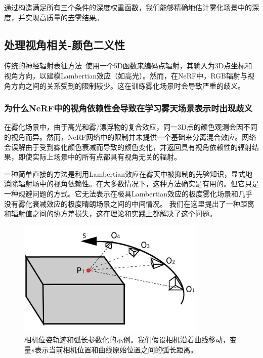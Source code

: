 通过构造满足所有三个条件的深度权重函数，我们能够精确地估计雾化场景中的深度，并实现高质量的去雾结果。

\subsection{处理视角相关-颜色二义性}
传统的神经辐射表征方法~\cite{mildenhall_nerf_2020}使用一个5D函数来编码点辐射，其输入为3D点坐标和视角方向，以建模Lambertian效应（如高光）。然而，在NeRF中，RGB辐射与视角方向之间的关系受到的限制较少。这在训练雾化场景时会导致严重的歧义。

\subsubsection{为什么NeRF中的视角依赖性会导致在学习雾天场景表示时出现歧义}

在雾化场景中，由于高光和雾/漂浮物的复合效应，同一3D点的颜色观测会因不同的视角而异。然而，NeRF网络中的限制并未提供一个基础来分离混合效应。网络会误解由于受到雾化颜色衰减而导致的颜色变化，并返回具有视角依赖性的辐射结果，即使实际上场景中的所有点都具有视角无关的辐射。

一种简单直接的方法是利用Lambertian效应在雾天中被抑制的先验知识，显式地消除辐射场中的视角依赖性。在大多数情况下，这种方法确实是有用的。但它只是一种规避问题的方式。它无法表示在极具Lambertian效应的极度雾化场景和几乎没有雾化衰减效应的极度晴朗场景之间的中间情况。
我们在这里提出了一种距离和辐射值之间的协方差损失，这在理论和实践上都解决了这个问题。

\begin{figure}[ht]
    \centering
    \includegraphics[width=0.8\textwidth]{undergraduate-thesis/images/dehazing-nerf/s-multivalues_example.pdf}
    \caption{相机位姿轨迹和弧长参数化的示例。我们假设相机沿着曲线移动，变量$s$表示当前相机位置和曲线原始位置之间的弧长距离。}
    \label{fig:dehazing-nerf s-multivalues_example}
\end{figure}

